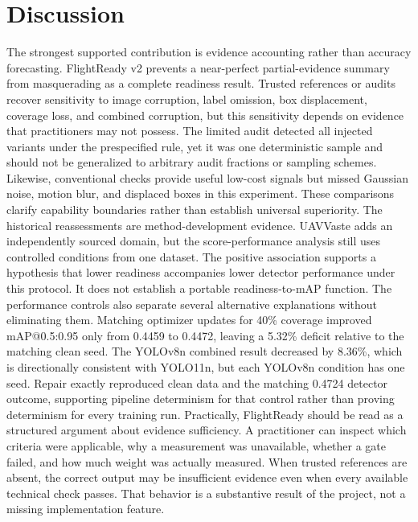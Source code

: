 \documentclass[conference]{IEEEtran}
\begin{document}
\section{Discussion}
The strongest supported contribution is evidence accounting rather than accuracy forecasting. FlightReady v2 prevents a near-perfect partial-evidence summary from masquerading as a complete readiness result. Trusted references or audits recover sensitivity to image corruption, label omission, box displacement, coverage loss, and combined corruption, but this sensitivity depends on evidence that practitioners may not possess.
The limited audit detected all injected variants under the prespecified rule, yet it was one deterministic sample and should not be generalized to arbitrary audit fractions or sampling schemes. Likewise, conventional checks provide useful low-cost signals but missed Gaussian noise, motion blur, and displaced boxes in this experiment. These comparisons clarify capability boundaries rather than establish universal superiority.
The historical reassessments are method-development evidence. UAVVaste adds an independently sourced domain, but the score-performance analysis still uses controlled conditions from one dataset. The positive association supports a hypothesis that lower readiness accompanies lower detector performance under this protocol. It does not establish a portable readiness-to-mAP function.
The performance controls also separate several alternative explanations without eliminating them. Matching optimizer updates for 40\% coverage improved mAP@0.5:0.95 only from 0.4459 to 0.4472, leaving a 5.32\% deficit relative to the matching clean seed. The YOLOv8n combined result decreased by 8.36\%, which is directionally consistent with YOLO11n, but each YOLOv8n condition has one seed. Repair exactly reproduced clean data and the matching 0.4724 detector outcome, supporting pipeline determinism for that control rather than proving determinism for every training run.
Practically, FlightReady should be read as a structured argument about evidence sufficiency. A practitioner can inspect which criteria were applicable, why a measurement was unavailable, whether a gate failed, and how much weight was actually measured. When trusted references are absent, the correct output may be insufficient evidence even when every available technical check passes. That behavior is a substantive result of the project, not a missing implementation feature.
\end{document}
